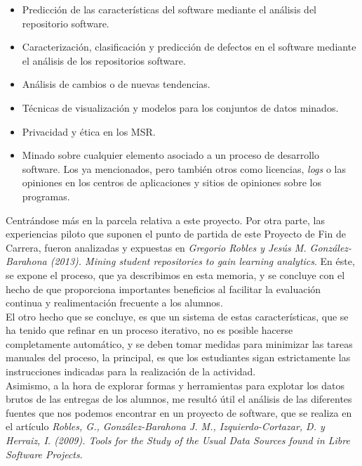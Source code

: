 \begin{itemize}
\item Predicción de las características del software mediante el análisis del repositorio software.\\

\item Caracterización, clasificación y predicción de defectos en el software mediante el análisis de los repositorios software.\\

\item Análisis de cambios o de nuevas tendencias.\\

\item Técnicas de visualización y modelos para los conjuntos de datos minados.\\

\item Privacidad y ética en los MSR.\\

\item Minado sobre cualquier elemento asociado a un proceso de desarrollo software. Los ya mencionados, pero también otros como licencias, \textit{logs} o las opiniones en los centros de aplicaciones y sitios de opiniones sobre los programas.
\end{itemize}


Centrándose más en la parcela relativa a este proyecto. Por otra parte, las experiencias piloto que suponen el punto de partida de este Proyecto de Fin de Carrera, fueron analizadas y expuestas en \textit{Gregorio Robles y Jesús M. González-Barahona (2013). Mining student repositories to gain learning analytics}. En éste, se expone el proceso, que ya describimos en esta memoria, y se concluye con el hecho de que proporciona importantes beneficios al facilitar la evaluación continua y realimentación frecuente a los alumnos.\\


El otro hecho que se concluye, es que un sistema de estas características, que se ha tenido que refinar en un proceso iterativo, no es posible hacerse completamente automático, y se deben tomar medidas para minimizar las tareas manuales del proceso, la principal, es que los estudiantes sigan estrictamente las instrucciones indicadas para la realización de la actividad.\\


Asimismo, a la hora de explorar formas y herramientas para explotar los datos brutos de las entregas de los alumnos, me resultó útil el análisis de las diferentes fuentes que nos podemos encontrar en un proyecto de software, que se realiza en el artículo \textit{Robles, G., González-Barahona J. M., Izquierdo-Cortazar, D. y Herraiz, I. (2009). Tools for the Study of the Usual Data Sources found in Libre Software Projects}.\\


